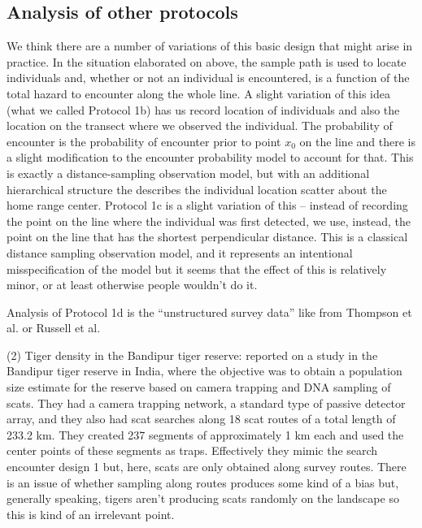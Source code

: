 \subsection{Analysis of other protocols}

We think there are a number of variations of this basic design that
might arise in practice.
In the situation elaborated on above,
the sample path is used to locate individuals and, whether or not an
individual is encountered, is a function of the total hazard to
encounter along the whole line.
A slight variation of this idea (what we called Protocol 1b)
has us record location of individuals and also the location on the
transect where we observed the individual.
The probability of encounter is the probability of encounter prior to
point $x_{0}$ on the line
\citep{skaug_schweder:1999}
and there
is a slight modification to the encounter probability model to account
for that. This is exactly a
 distance-sampling observation model, but with an
additional hierarchical structure the describes the individual
location scatter about the home range center.
Protocol 1c is a slight variation of this -- instead of recording the
point on the line where the individual was first detected, we use,
instead, the point on the line that has the shortest perpendicular
distance. This is a classical distance sampling observation model, and
it  represents an intentional misspecification of the model
but it seems that the effect of this is relatively minor, or at least
otherwise people wouldn't do it.

Analysis of Protocol 1d is the ``unstructured survey data'' like
from Thompson et al. or Russell et al. 

(2) Tiger density in the Bandipur tiger reserve:
\citet{gopalaswamy_etal:2012ecol} reported on a study in the Bandipur
tiger reserve in India, where the objective was to obtain a population
size estimate for the reserve based on camera trapping and DNA
sampling of scats.  They had a camera trapping network, a standard
type of passive detector array, and they also had scat searches along
18 scat routes of a total length of 233.2 km. They created 237
segments of approximately 1 km each and used the center points of
these segments as traps. Effectively they mimic the search encounter
design 1 but, here, scats are only obtained along survey routes.
There is an issue of whether sampling along routes produces some kind
of a bias but, generally speaking, tigers aren't producing scats
randomly on the landscape so this is kind of an irrelevant point.



